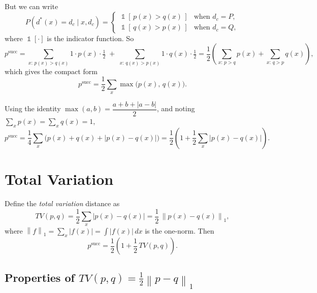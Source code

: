 \documentclass[11pt]{article}
\DeclareMathOperator{\indic}{\mathbb{1}}
\newcommand{\onenorm}[1]{\left\lVert #1 \right\rVert_{1}}
\begin{document}
But we can write
\[
P\!\left(d^{*}(x)=d_{c}\mid x,d_{c}\right)
=
\begin{cases}
\indic\!\left[\,p(x)>q(x)\,\right] & \text{when } d_{c}=P,\\[4pt]
\indic\!\left[\,q(x)>p(x)\,\right] & \text{when } d_{c}=Q,
\end{cases}
\]
where $\indic[\cdot]$ is the indicator function. So
\[
p^{\mathrm{succ}}
= \sum_{x:\,p(x)>q(x)} 1\cdot p(x)\cdot\tfrac12
\;+\;
\sum_{x:\,q(x)>p(x)} 1\cdot q(x)\cdot\tfrac12
= \frac12\!\left(\sum_{x:\,p>q} p(x) + \sum_{x:\,q>p} q(x)\right),
\]
which gives the compact form
\[
\boxed{\; p^{\mathrm{succ}} = \frac12\sum_{x}\max\!\big(p(x),\,q(x)\big). \;}
\]

Using the identity $\max(a,b)=\dfrac{a+b+|a-b|}{2}$, and noting
$\sum_x p(x)=\sum_x q(x)=1$,
\[
p^{\mathrm{succ}}
= \frac14\sum_{x}\Big(p(x)+q(x)+|p(x)-q(x)|\Big)
= \frac12\!\left(1 + \frac12\sum_{x}|p(x)-q(x)|\right).
\]

\section{Total Variation}

Define the \emph{total variation} distance as
\[
\boxed{\;
TV(p,q) = \frac12\sum_{x}|p(x)-q(x)|
= \frac12\,\onenorm{p(x)-q(x)},
\;}
\]
where $\onenorm{f} = \sum_{x}|f(x)| = \displaystyle\int|f(x)|\,dx$ is the
one-norm. Then
\[
\boxed{\;
p^{\mathrm{succ}} = \frac12\!\left(1 + \frac12\,TV(p,q)\right).
\;}
\]

\subsection*{Properties of $TV(p,q)=\tfrac12\onenorm{p-q}$}
\end{document}
